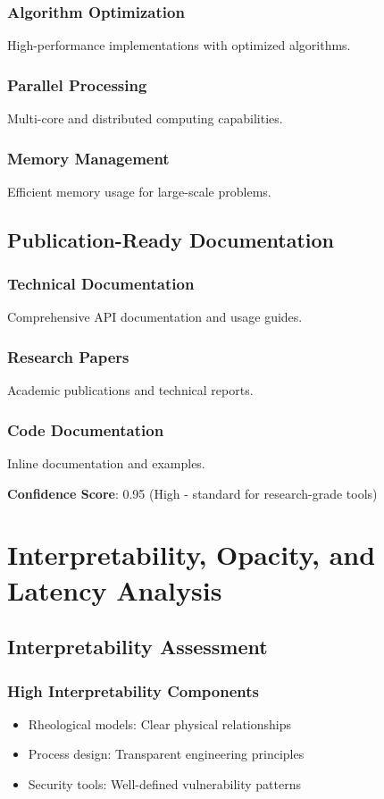 \documentclass[11pt,a4paper]{article}
\begin{document}
\subsubsection{Algorithm Optimization}
High-performance implementations with optimized algorithms.

\subsubsection{Parallel Processing}
Multi-core and distributed computing capabilities.

\subsubsection{Memory Management}
Efficient memory usage for large-scale problems.

\subsection{Publication-Ready Documentation}

\subsubsection{Technical Documentation}
Comprehensive API documentation and usage guides.

\subsubsection{Research Papers}
Academic publications and technical reports.

\subsubsection{Code Documentation}
Inline documentation and examples.

\textbf{Confidence Score}: 0.95 (High - standard for research-grade tools)

\section{Interpretability, Opacity, and Latency Analysis}
\label{sec:analysis}

\subsection{Interpretability Assessment}

\subsubsection{High Interpretability Components}
\begin{itemize}
    \item Rheological models: Clear physical relationships
    \item Process design: Transparent engineering principles
    \item Security tools: Well-defined vulnerability patterns
\end{itemize}
\end{document}

